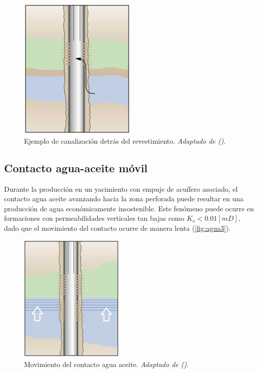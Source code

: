 \begin{figure}\centering
    \includegraphics[width=0.5\textwidth]{Graphics/agua2.png}
    \caption[Canalización detras del revestimiento]{Ejemplo de canalización detrás del revestimiento. \emph{Adaptado de (\cite{Bailey2000})}.}
    \label{fig:agua2}
\end{figure}

\subsection{Contacto agua-aceite móvil}
Durante la producción en un yacimiento con empuje de acuífero asociado, el contacto agua aceite avanzando hacia la zona perforada puede resultar en una producción de agua económicamente insostenible. Este fenómeno puede ocurre en formaciones con permeabilidades verticales tan bajas como $K_{v}<0.01[mD]$, dado que el movimiento del contacto ocurre de manera lenta (\autoref{fig:agua3}).

\begin{figure}\centering
    \includegraphics[width=0.45\textwidth]{Graphics/agua3.png}
    \caption[Movimiento del contacto agua aceite]{Movimiento del contacto agua aceite. \emph{Adaptado de (\cite{Bailey2000})}.}
    \label{fig:agua3}
\end{figure}


